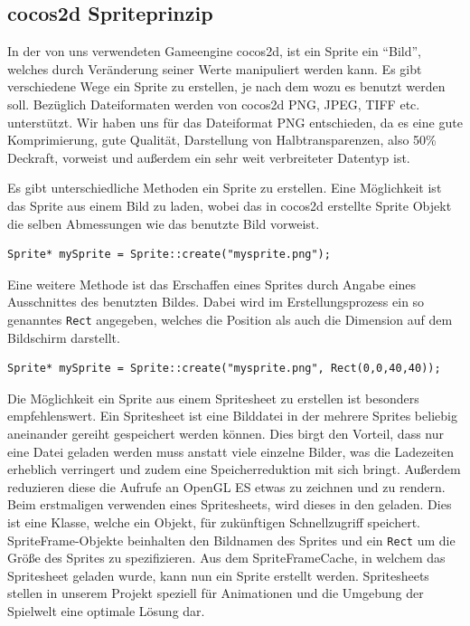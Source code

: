 \subsection{cocos2d Spriteprinzip}
In der von uns verwendeten Gameengine cocos2d, ist ein Sprite ein “Bild”, welches durch Veränderung seiner Werte manipuliert werden kann. Es gibt verschiedene Wege ein Sprite zu erstellen, je nach dem wozu es benutzt werden soll. Bezüglich Dateiformaten werden von cocos2d PNG, JPEG, TIFF etc. unterstützt. Wir haben uns für das Dateiformat PNG entschieden, da es eine gute Komprimierung, gute Qualität, Darstellung von Halbtransparenzen, also 50\% Deckraft, vorweist und außerdem ein sehr weit verbreiteter Datentyp ist.

Es gibt unterschiedliche Methoden ein Sprite zu erstellen. Eine Möglichkeit ist das Sprite aus einem Bild zu laden, wobei das in cocos2d erstellte Sprite Objekt die selben Abmessungen wie das benutzte Bild vorweist. 

\begin{lstlisting}[style=singleline]
Sprite* mySprite = Sprite::create("mysprite.png");
\end{lstlisting}

Eine weitere Methode ist das Erschaffen eines Sprites durch Angabe eines Ausschnittes des benutzten Bildes. Dabei wird im Erstellungsprozess ein so genanntes \texttt{Rect} angegeben, welches die Position als auch die Dimension auf dem Bildschirm darstellt. 

\begin{lstlisting}[style=singleline]
Sprite* mySprite = Sprite::create("mysprite.png", Rect(0,0,40,40));
\end{lstlisting}

Die Möglichkeit ein Sprite aus einem Spritesheet zu erstellen ist besonders empfehlenswert. Ein Spritesheet ist eine Bilddatei in der mehrere Sprites beliebig aneinander gereiht gespeichert werden können. Dies birgt den Vorteil, dass nur eine Datei geladen werden muss anstatt viele einzelne Bilder, was die Ladezeiten erheblich verringert und zudem eine Speicherreduktion mit sich bringt. Außerdem reduzieren diese die Aufrufe an OpenGL ES etwas zu zeichnen und zu rendern. Beim erstmaligen verwenden eines Spritesheets, wird dieses in den  geladen. Dies ist eine Klasse, welche ein  Objekt, für zukünftigen Schnellzugriff speichert. SpriteFrame-Objekte beinhalten den Bildnamen des Sprites und ein \texttt{Rect} um die Größe des Sprites zu spezifizieren. Aus dem SpriteFrameCache, in welchem das Spritesheet geladen wurde, kann nun ein Sprite erstellt werden.
Spritesheets stellen in unserem Projekt speziell für Animationen und die Umgebung der Spielwelt eine optimale Lösung dar. 



